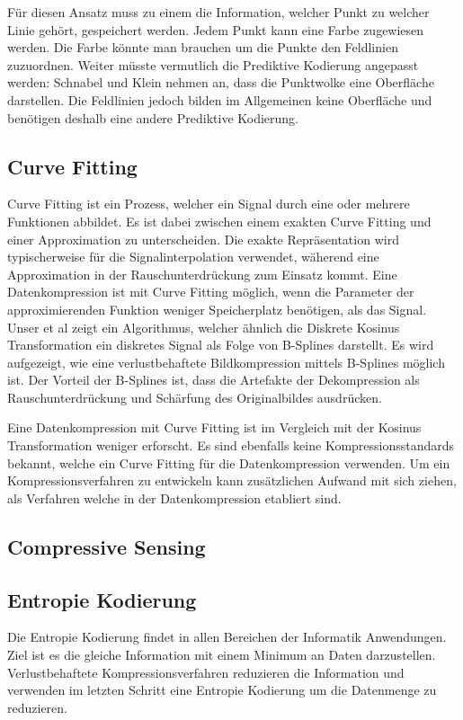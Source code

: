 Für diesen Ansatz muss zu einem die Information, welcher Punkt zu welcher Linie gehört, gespeichert werden. Jedem Punkt kann eine Farbe zugewiesen werden. Die Farbe könnte man brauchen um die Punkte den Feldlinien zuzuordnen. Weiter müsste vermutlich die Prediktive Kodierung angepasst werden: Schnabel und Klein nehmen an, dass die Punktwolke eine Oberfläche darstellen. Die Feldlinien jedoch bilden im Allgemeinen keine Oberfläche und benötigen deshalb eine andere Prediktive Kodierung.

\subsection{Curve Fitting}
Curve Fitting ist ein Prozess, welcher ein Signal durch eine oder mehrere Funktionen abbildet. Es ist dabei zwischen einem exakten Curve Fitting und einer Approximation zu unterscheiden. Die exakte Repräsentation wird typischerweise für die Signalinterpolation verwendet, wäherend eine Approximation in der Rauschunterdrückung zum Einsatz kommt. Eine Datenkompression ist mit Curve Fitting möglich, wenn die Parameter der approximierenden Funktion weniger Speicherplatz benötigen, als das Signal.
Unser et al \cite{unser1993b:spline} zeigt ein Algorithmus, welcher ähnlich die Diskrete Kosinus Transformation ein diskretes Signal als Folge von B-Splines darstellt. Es wird aufgezeigt, wie eine verlustbehaftete Bildkompression mittels B-Splines möglich ist. Der Vorteil der B-Splines ist, dass die Artefakte der Dekompression als Rauschunterdrückung und Schärfung des Originalbildes ausdrücken.

Eine Datenkompression mit Curve Fitting ist im Vergleich mit der Kosinus Transformation weniger erforscht. Es sind ebenfalls keine Kompressionsstandards bekannt, welche ein Curve Fitting für die Datenkompression verwenden. Um ein Kompressionsverfahren zu entwickeln kann zusätzlichen Aufwand mit sich ziehen, als Verfahren welche in der Datenkompression etabliert sind.

\subsection{Compressive Sensing}


\subsection{Entropie Kodierung}
Die Entropie Kodierung findet in allen Bereichen der Informatik Anwendungen. Ziel ist es die gleiche Information mit einem Minimum an Daten darzustellen. Verlustbehaftete Kompressionsverfahren reduzieren die Information und verwenden im letzten Schritt eine Entropie Kodierung um die Datenmenge zu reduzieren.



